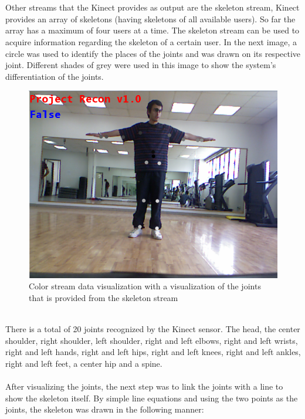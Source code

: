 \\
\\
Other streams that the Kinect provides as output are the skeleton stream, Kinect provides an array of skeletons (having skeletons of all available users). So far the array has a maximum of four users at a time. The skeleton stream can be used to acquire information regarding the skeleton of a certain user. In the next image, a circle was used to identify the places of the joints and was drawn on its respective joint. Different shades of grey were used in this image to show the system's differentiation of the joints.
\\
\begin{figure}[ht]
\centering
\includegraphics[scale=1]{images/color_joints.png}
\caption{Color stream data visualization with a visualization of the joints that is provided from the skeleton stream}
\label{4.4}
\end{figure}
\\
There is a total of 20 joints recognized by the Kinect sensor. The head, the center shoulder, right shoulder, left shoulder, right and left elbows, right and left wrists, right and left hands, right and left hips, right and left knees, right and left ankles, right and left feet, a center hip and a spine.
\\
\\
After visualizing the joints, the next step was to link the joints with a line to show the skeleton itself. By simple line equations and using the two points as the joints, the skeleton was drawn in the following manner:
\\
\\
